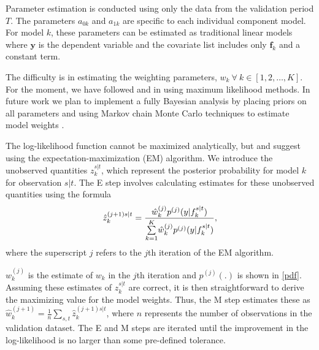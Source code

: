 Parameter estimation is conducted using only the data from the
validation period $T$.  The parameters $a_{0k}$ and $a_{1k}$ are
specific to each individual component model.  For model $k$, these
parameters can be estimated as traditional linear models where
$\mathbf{y}$ is the dependent variable and the covariate list includes
only $\mathbf{f}_k$ and a constant term.

The difficulty is in estimating the weighting parameters,
$w_k~\forall~ k \in [1, 2, \dots, K]$. For the moment, we have
followed \citet{Raftery:2005} and \citet{Sloughter:2007} in using
maximum likelihood methods. In future work we plan to implement a
fully Bayesian analysis by placing priors on all parameters and using
Markov chain Monte Carlo techniques to estimate model weights
\citep[c.f.][]{Vrugt:2008}.

The log-likelihood function cannot be maximized analytically, but
\citet{Raftery:2005} and \citet{Sloughter:2007} suggest using the
expectation-maximization (EM) algorithm.  We introduce the unobserved
quantities $z_{k}^{s|t}$, which represent the posterior probability for
model $k$ for observation $s |t $.  The E step involves calculating
estimates for these unobserved quantities using the formula
\begin{equation}
\small
\hat{z}^{(j+1)s|t}_{k} = \frac{\hat{w}^{(j)}_k
p^{(j)}(y|f_{k}^{s|t})}{\overset{K}{\underset{k=1}{\sum}}\hat{w}^{(j)}_kp^{(j)}(y|f_{k}^{s|t})},
\end{equation}
\noindent where the superscript $j$ refers to the $j$th iteration of
the EM algorithm.

$w_k^{(j)}$ is the estimate of $w_k$ in the $j$th iteration and
$p^{(j)}(.)$ is shown in \eqref{pdf}.  Assuming these estimates of
$z_{k}^{s|t}$ are correct, it is then straightforward to derive the
maximizing value for the model weights. Thus, the M step estimates
these as
$\hat{w}^{(j+1)}_k=\frac{1}{n}\underset{s,t}{\sum}\hat{z}^{(j+1)s|t}_{k}$,
where $n$ represents the number of observations in the validation
dataset.
The E and M steps are iterated until the improvement in the
log-likelihood is no larger than some pre-defined tolerance.

